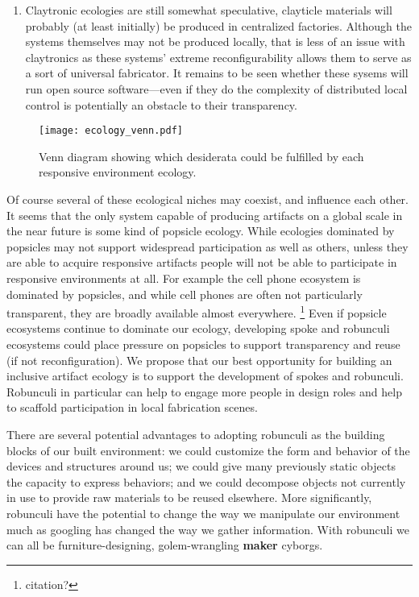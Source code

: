 \begin{enumerate}
\item Claytronic ecologies are still somewhat speculative, clayticle materials will probably (at least initially) be produced in centralized factories. 
Although the systems themselves may not be produced locally, that is less of an issue with claytronics as these systems' extreme reconfigurability allows them to serve as a sort of universal fabricator. 
It remains to be seen whether these sysems will run open source software---even if they do the complexity of distributed local control is potentially an obstacle to their transparency. 

\end{enumerate} 

\begin{figure}[tb]
  \centering
    \texttt{[image: ecology\_venn.pdf]}
  \caption{Venn diagram showing which desiderata could be fulfilled by each responsive environment ecology.}
  \label{fig:ecology_venn}
\end{figure}

Of course several of these ecological niches may coexist, and influence each other. 
It seems that the only system capable of producing artifacts on a global scale in the near future is some kind of popsicle ecology. 
While ecologies dominated by popsicles may not support widespread participation as well as others, unless they are able to acquire responsive artifacts people will not be able to participate in responsive environments at all. 
For example the cell phone ecosystem is dominated by popsicles, and while cell phones are often not particularly transparent, they are broadly available almost everywhere.%
\footnote{citation?}
Even if popsicle ecosystems continue to dominate our ecology, developing spoke and robunculi ecosystems could place pressure on popsicles to support transparency and reuse (if not reconfiguration). 
We propose that our best opportunity for building an inclusive artifact ecology is to support the development of spokes and robunculi. 
Robunculi in particular can help to engage more people in design roles and help to scaffold participation in local fabrication scenes.

There are several potential advantages to adopting robunculi as the building blocks of our built environment: we could customize the form and behavior of the devices and structures around us; we could give many previously static objects the capacity to express behaviors; and we could decompose objects not currently in use to provide raw materials to be reused elsewhere. 
More significantly, robunculi have the potential to change the way we manipulate our environment much as googling has changed the way we gather information. 
With robunculi we can all be furniture{}-designing, golem{}-wrangling {\bf maker} cyborgs.

